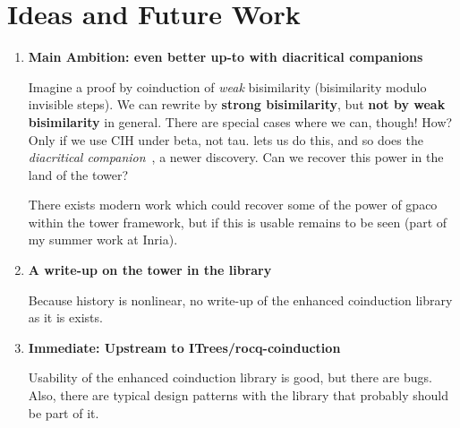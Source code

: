 \section{Ideas and Future Work}
\label{sec:future}

\begin{enumerate}
  \item \textbf{Main Ambition: even better up-to with diacritical companions}

        Imagine a proof by coinduction of \emph{weak} bisimilarity (bisimilarity
        modulo invisible steps). We can rewrite by \textbf{strong bisimilarity},
        but \textbf{not by weak bisimilarity} in general. There are special cases
        where we can, though! How? Only if we use CIH under beta, not tau.
         lets us do this, and so does the \emph{diacritical
        companion}~\cite{diacritical}, a newer discovery. Can we recover this power in the land of
        the tower?

        There exists modern work which could recover some of the power of gpaco
        within the tower framework, but if this is usable remains to be seen
        (part of my summer work at Inria).

  \item \textbf{A write-up on the tower in the library}

        Because history is nonlinear, no write-up of the enhanced coinduction
        library as it is exists.

  \item \textbf{Immediate: Upstream to ITrees/rocq-coinduction}

        Usability of the enhanced coinduction library is good, but there are
        bugs. Also, there are typical design patterns with the library that
        probably should be part of it.
\end{enumerate}

